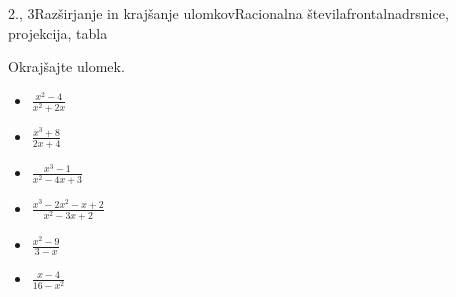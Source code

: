 \begin{priprava}{2., 3}{}{Razširjanje in krajšanje ulomkov}{Racionalna števila}{frontalna}{drsnice, projekcija, tabla}
        
            \begin{naloga}
                Okrajšajte ulomek.
                \begin{itemize}
                            \item $\frac{x^2-4}{x^2+2x}$ 
                            \item $\frac{x^3+8}{2x+4}$ 
                            \item $\frac{x^3-1}{x^2-4x+3}$ 
                            \item $\frac{x^3-2x^2-x+2}{x^2-3x+2}$ 
                            \item $\frac{x^2-9}{3-x}$ 
                            \item $\frac{x-4}{16-x^2}$ 
                \end{itemize}
            \end{naloga}
        


\end{priprava}